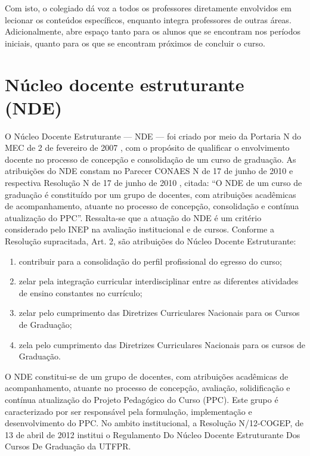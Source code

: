 Com isto, o colegiado dá voz a todos os professores diretamente envolvidos em lecionar os conteúdos específicos, enquanto integra professores de outras áreas. Adicionalmente, abre espaço tanto para os alunos que se encontram nos períodos iniciais, quanto para os que se encontram próximos de concluir o curso.


\section{Núcleo docente estruturante (NDE)}

O Núcleo Docente Estruturante — NDE — foi criado por meio da Portaria N do MEC de 2 de fevereiro de 2007 \cite{portaria147mec}, com o propósito de qualificar o envolvimento docente no processo de concepção e consolidação de um curso de graduação. As atribuições do NDE constam no Parecer CONAES N de 17 de junho de 2010 \cite{parecerconaes4} e respectiva Resolução N de 17 de junho de 2010 \cite{resconaes1}, citada: ``O NDE de um curso de graduação é constituído por um grupo de docentes, com atribuições acadêmicas de acompanhamento, atuante no processo de concepção, consolidação e contínua atualização do PPC''. Ressalta-se que a atuação do NDE é um critério considerado pelo INEP na avaliação institucional e de cursos. Conforme a Resolução supracitada, Art. 2\textordmasculine, são atribuições do Núcleo Docente Estruturante: 

\begin{enumerate}
    \item contribuir para a consolidação do perfil profissional do egresso do curso;
    \item zelar pela integração curricular interdisciplinar entre as diferentes atividades de ensino constantes no currículo;
    \item zelar pelo cumprimento das Diretrizes Curriculares Nacionais para os Cursos de Graduação;
    \item zela pelo cumprimento das Diretrizes Curriculares Nacionais para os cursos de Graduação.
\end{enumerate}

O NDE constitui-se de um grupo de docentes, com atribuições acadêmicas de acompanhamento, atuante no processo de concepção, avaliação, solidificação e contínua atualização do Projeto Pedagógico do Curso (PPC). Este grupo é caracterizado por ser responsável pela formulação, implementação e desenvolvimento do PPC. No ambito institucional, a Resolução N/12-COGEP, de 13 de abril de 2012 \cite{cogep9} institui o Regulamento Do Núcleo Docente Estruturante Dos Cursos De Graduação da UTFPR.

